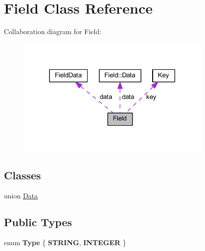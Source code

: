 \hypertarget{struct_field}{}\section{Field Class Reference}
\label{struct_field}


Collaboration diagram for Field\+:
\nopagebreak
\begin{figure}[H]
\begin{center}
\leavevmode
\includegraphics[width=272pt]{struct_field__coll__graph}
\end{center}
\end{figure}
\subsection*{Classes}
\begin{DoxyCompactItemize}
\item 
union \hyperlink{union_field_1_1_data}{Data}
\end{DoxyCompactItemize}
\subsection*{Public Types}
\begin{DoxyCompactItemize}
\item 
\mbox{\label{struct_field_ab791686c1600914e014bacad1e6459f1}} 
enum {\bfseries Type} \{ {\bfseries S\+T\+R\+I\+NG}, 
{\bfseries I\+N\+T\+E\+G\+ER}
 \}
\end{DoxyCompactItemize}
